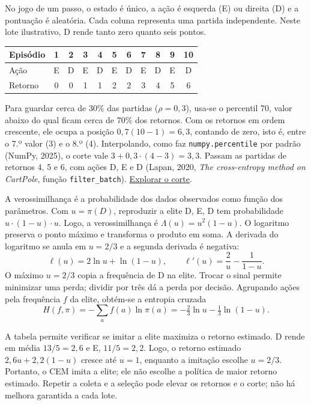 \documentclass[12pt]{article}
\begin{document}
No jogo de um passo, o estado é único, a ação é esquerda (E) ou direita (D) e a pontuação é aleatória. Cada coluna representa uma partida independente. Neste lote ilustrativo, D rende tanto zero quanto seis pontos.

\begin{center}
\begin{tabular}{l*{10}{c}}
\toprule
Episódio & 1 & 2 & 3 & 4 & 5 & 6 & 7 & 8 & 9 & 10\\
\midrule
Ação & E & D & E & D & E & D & E & D & E & D\\
Retorno & 0 & 0 & 1 & 1 & 2 & 2 & 3 & 4 & 5 & 6\\
\bottomrule
\end{tabular}
\end{center}

Para guardar cerca de 30\% das partidas ($\rho=0{,}3$), usa-se o percentil 70, valor abaixo do qual ficam cerca de 70\% dos retornos. Com os retornos em ordem crescente, ele ocupa a posição $0{,}7(10-1)=6{,}3$, contando de zero, isto é, entre o 7.º valor (3) e o 8.º (4). Interpolando, como faz \texttt{numpy.percentile} por padrão (NumPy, 2025), o corte vale $3+0{,}3\cdot(4-3)=3{,}3$. Passam as partidas de retornos 4, 5 e 6, com ações D, E e D (Lapan, 2020, \emph{The cross-entropy method on CartPole}, função \texttt{filter\_batch}). \href{https://metodo-da-entropia-cruzada.vercel.app/selecao.html}{Explorar o corte}.

A verossimilhança é a probabilidade dos dados observados como função dos parâmetros. Com $u=\pi(D)$, reproduzir a elite D, E, D tem probabilidade $u\cdot(1-u)\cdot u$. Logo, a verossimilhança é $\Lambda(u)=u^2(1-u)$. O logaritmo preserva o ponto máximo e transforma o produto em soma. A derivada do logaritmo se anula em $u=2/3$ e a segunda derivada é negativa:
\[
 \ell(u)=2\ln u+\ln(1-u),\qquad \ell'(u)=\frac2u-\frac1{1-u}.
\]
O máximo $u=2/3$ copia a frequência de D na elite. Trocar o sinal permite minimizar uma perda; dividir por três dá a perda por decisão. Agrupando ações pela frequência $f$ da elite, obtém-se a entropia cruzada
\[
 H(f,\pi)=-\sum_a f(a)\ln\pi(a)=-\tfrac23\ln u-\tfrac13\ln(1-u).
\]

A tabela permite verificar se imitar a elite maximiza o retorno estimado. D rende em média $13/5=2{,}6$ e E, $11/5=2{,}2$. Logo, o retorno estimado $2{,}6u+2{,}2(1-u)$ cresce até $u=1$, enquanto a imitação escolhe $u=2/3$. Portanto, o CEM imita a elite; ele não escolhe a política de maior retorno estimado. Repetir a coleta e a seleção pode elevar os retornos e o corte; não há melhora garantida a cada lote.
\end{document}
